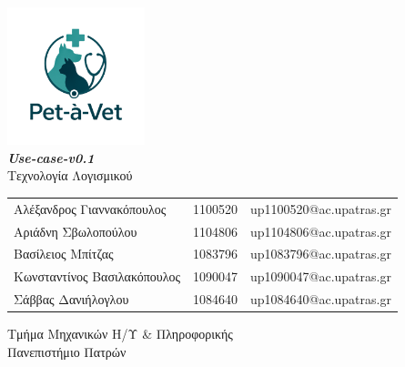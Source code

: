 \documentclass[12pt,a4paper,twoside]{book}
\begin{document}
\let\cleardoublepage\clearpage


\begin{titlepage}
  \vspace*{5cm}
  \begin{center}
    \includegraphics[width=0.3\textwidth]{../Resources/Pet-a-vet-logo-transparent.png}\\
    \vspace*{0.5cm}
    {\large \textbf{\textit{Use-case-v0.1}}}\\
    {\large Τεχνολογία Λογισμικού}
    \vspace*{5cm}
    \\
    \vspace*{1cm}
    \begin{tabular}{l l l}
      \large Αλέξανδρος Γιαννακόπουλος   & \large 1100520 & \large up1100520@ac.upatras.gr \\ %
      \large Αριάδνη Σβωλοπούλου         & \large 1104806 & \large up1104806@ac.upatras.gr \\ %
      \large Βασίλειος Μπίτζας           & \large 1083796 & \large up1083796@ac.upatras.gr \\
      \large Κωνσταντίνος Βασιλακόπουλος & \large 1090047 & \large up1090047@ac.upatras.gr \\
      \large Σάββας Δανιήλογλου          & \large 1084640 & \large up1084640@ac.upatras.gr
    \end{tabular}

    \vspace*{1cm}

    {\normalsize Τμήμα Μηχανικών Η/Υ \& Πληροφορικής}
    \\
    {\normalsize Πανεπιστήμιο Πατρών}
    \\
  \end{center}
  \thispagestyle{empty} %
\end{titlepage}
\end{document}
